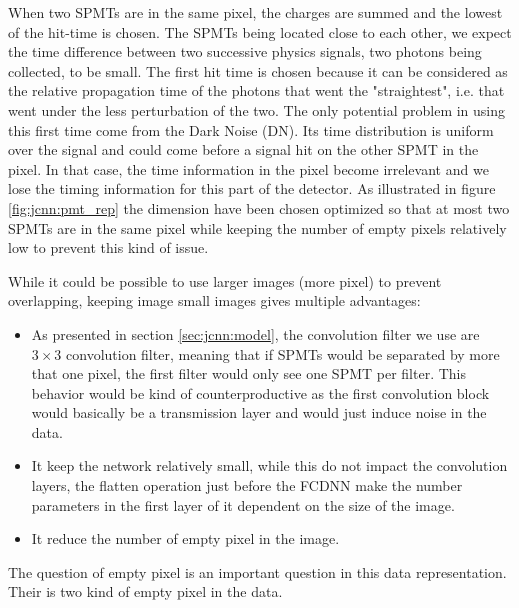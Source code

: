 When two SPMTs are in the same pixel, the charges are summed and the lowest of the hit-time is chosen. The SPMTs being located close to each other, we expect the time difference between two successive physics signals, two photons being collected, to be small. The first hit time is chosen because it can be considered as the relative propagation time of the photons that went the "straightest", i.e. that went under the less perturbation of the two. The only potential problem in using this first time come from the Dark Noise (DN). Its time distribution is uniform over the signal and could come before a signal hit on the other SPMT in the pixel. In that case, the time information in the pixel become irrelevant and we lose the timing information for this part of the detector.
As illustrated in figure \ref{fig:jcnn:pmt_rep} the dimension have been chosen optimized so that at most two SPMTs are in the same pixel while keeping the number of empty pixels relatively low to prevent this kind of issue.

While it could be possible to use larger images (more pixel) to prevent overlapping, keeping image small images gives multiple advantages:
\begin{itemize}
  \item As presented in section \ref{sec:jcnn:model}, the convolution filter we use are $3 \times 3$ convolution filter, meaning that if SPMTs would be separated by more that one pixel, the first filter would only see one SPMT per filter. This behavior would be kind of counterproductive as the first convolution block would basically be a transmission layer and would just induce noise in the data.
  \item It keep the network relatively small, while this do not impact the convolution layers, the flatten operation just before the FCDNN make the number parameters in the first layer of it dependent on the size of the image.
  \item It reduce the number of empty pixel in the image.
\end{itemize}
The question of empty pixel is an important question in this data representation. Their is two kind of empty pixel in the data.

